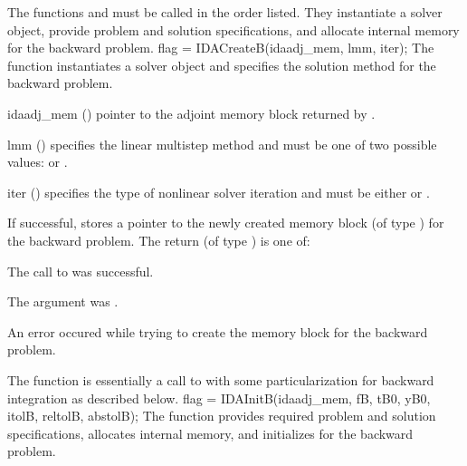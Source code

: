 The functions  and  must be called in the order listed. 
They instantiate a {\idas} solver object, provide problem and solution specifications, 
and allocate internal memory for the backward problem.
{
  flag = IDACreateB(idaadj\_mem, lmm, iter);
}
{
  The function  instantiates a {\idas} solver object and specifies 
  the solution method for the backward problem.
}
{
  \begin{args}
  \item[idaadj\_mem] ()
    pointer to the adjoint memory block returned by .
  \item[lmm] ()
    specifies the linear multistep method and must be one of two
    possible values:  or .     
  \item[iter] ()
    specifies the type of nonlinear solver iteration and must be
    either  or . 
  \end{args}
}
{
  If successful,  stores a pointer to the newly created 
  {\idas} memory block (of type ) for the backward problem.
  The return  (of type ) is one of:
  \begin{args}
  \item[\Id{IDA\_SUCCESS}]
    The call to  was successful.
  \item[\Id{IDA\_ADJMEM\_NULL}]
    The  argument was .
  \item[\Id{IDA\_MEM\_FAIL}]
    An error occured while trying to create the {\idas} memory block for the backward 
    problem.
  \end{args}
}
{}
The function  is essentially a call to  with some 
particularization for backward integration as described below.
{
  flag = IDAInitB(idaadj\_mem, fB, tB0, yB0, itolB, reltolB, abstolB);
}
{
  The function  provides required problem and solution specifications, 
  allocates internal memory, and initializes {\idas} for the backward problem.
}
